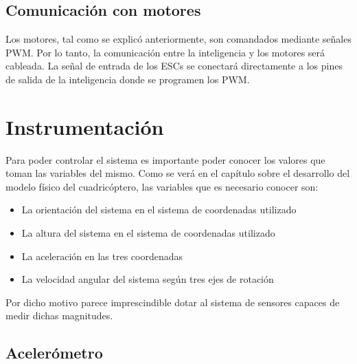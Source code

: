\documentclass[main]{subfiles}
\begin{document}
\subsection{Comunicaci\'on con motores}
\vspace*{15pt}

Los motores, tal como se explic\'o anteriormente, son comandados mediante se\~nales PWM. Por lo tanto, la comunicaci\'on entre la inteligencia y los motores ser\'a cableada. La se\~nal de entrada de los ESCs se conectar\'a directamente a los pines de salida de la inteligencia donde se programen los PWM. 

\newpage
\section{Instrumentaci\'on}
\vspace*{15pt}
Para poder controlar el sistema es importante poder conocer los valores que toman las variables del mismo. Como se ver\'a en el cap\'itulo sobre el desarrollo del modelo f\'isico del cuadric\'optero, las variables que es necesario conocer son:

\begin{itemize}
\item La orientaci\'on del sistema en el sistema de coordenadas utilizado
\item La altura del sistema en el sistema de coordenadas utilizado
\item La aceleraci\'on en las tres coordenadas
\item La velocidad angular del sistema seg\'un tres ejes de rotaci\'on
\end{itemize}

Por dicho motivo parece imprescindible dotar al sistema de sensores capaces de medir dichas magnitudes.

\subsection{Aceler\'ometro}
\label{acelerometro}
\vspace*{15pt}
\end{document}
